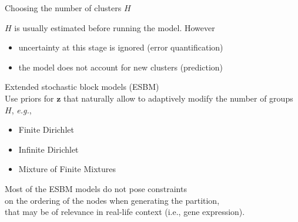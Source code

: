\begin{frame}{Choosing the number of clusters $H$}

$H$ is usually estimated \alert{before} running the model. However
\begin{itemize}
    \item uncertainty at this stage is ignored (\alert{error quantification})
    \item the model does not account for new clusters (\alert{prediction})
\end{itemize}
\vspace*{0.5cm}
\pause
\alert{Extended stochastic block models (ESBM)}\\
Use priors for $\bm{z}$ that naturally allow to adaptively modify the number of groups $H$, \emph{e.g.},
\begin{itemize}
    \item Finite Dirichlet
    \item Infinite Dirichlet
    \item Mixture of Finite Mixtures
\end{itemize}

\pause
\begin{center}
    \alert{Most of the ESBM models do not pose constraints\\
    on the ordering of the nodes when generating the partition,\\
    that may be of relevance in real-life context (i.e., gene expression).}    
\end{center}


\end{frame}








